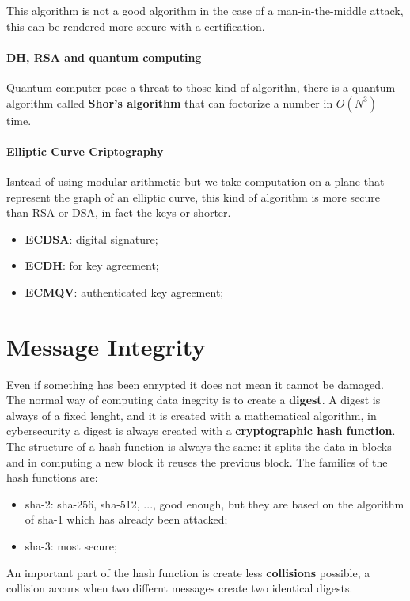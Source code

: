\documentclass[12pt]{article}
\begin{document}
This algorithm is not a good algorithm in the case of a man-in-the-middle attack, this can be rendered more secure with a certification.

\paragraph{DH, RSA and quantum computing}
Quantum computer pose a threat to those kind of algorithn, there is a quantum algorithm called \textbf{Shor's algorithm} that can foctorize a number in $O(N^{3})$ time.

\paragraph{Elliptic Curve Criptography}
Isntead of using modular arithmetic but we take computation on a plane that represent the graph of an elliptic curve, this kind of algorithm is more secure than RSA or DSA, in fact the keys or shorter.
\begin{itemize}
    \item \textbf{ECDSA}: digital signature;
    \item \textbf{ECDH}: for key agreement;
    \item \textbf{ECMQV}: authenticated key agreement;
\end{itemize}


\section{Message Integrity}
Even if something has been enrypted it does not mean it cannot be damaged. The normal way of computing data inegrity is to create a \textbf{digest}. A digest is always of a fixed lenght, and it is created with a mathematical algorithm, in cybersecurity a digest is always created with a \textbf{cryptographic hash function}. The structure of a hash function is always the same: it splits the data in blocks and in computing a new block it reuses the previous block. The families of the hash functions are:
\begin{itemize}
    \item sha-2: sha-256, sha-512, ..., good enough, but they are based on the algorithm of sha-1 which has already been attacked;
    \item sha-3: most secure;
\end{itemize}

An important part of the hash function is create less \textbf{collisions} possible, a collision accurs when two differnt messages create two identical digests.
\end{document}
